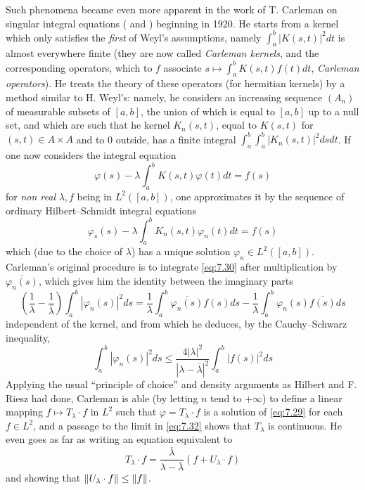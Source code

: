 \documentclass[12pt,a4paper,leqno,twoside]{extbook}
\DeclarePairedDelimiter{\norm}{\lVert}{\rVert}
\begin{document}
Such phenomena became even more apparent in the work of T. Carleman on singular integral equations (\cite{037} and \cite[p.~313--342]{038}) beginning in 1920. He starts from a kernel which only satisfies the \emph{first} of Weyl's assumptions, namely \(\int_a^b |K(s,t)|^2dt\) is almost everywhere finite (they are now called \emph{Carleman kernels}, and the corresponding operators, which to \(f\) associate \(s \mapsto \int_a^b K(s,t)f(t)dt\), \emph{Carleman operators}). He treats the theory of these operators (for hermitian kernels) by a method similar to H. Weyl's: namely, he considers an increasing sequence \((A_n)\) of measurable subsets of \([a,b]\), the union of which is equal to \([a,b]\) up to a null set, and which are such that he kernel \(K_n(s,t)\), equal to \(K(s,t)\) for \((s,t) \in A \times A\) and to 0 outside, has a finite integral \(\int_a^b \int_a^b |K_n(s,t)|^2 dsdt\). If one now considers the integral equation
\begin{equation}
    \label{eq:7.29}
    \varphi(s) - \lambda \int_a^b K(s,t)\varphi(t)dt = f(s)
\end{equation}
for \emph{non real} \(\lambda, f\) being in \(L^2([a,b])\), one approximates it by the sequence of ordinary Hilbert--Schmidt integral equations
\begin{equation}
    \label{eq:7.30}
    \varphi_s(s) - \lambda \int_a^b K_n(s,t)\varphi_n(t)dt = f(s)
\end{equation}
which (due to the choice of \(\lambda\)) has a unique solution \(\varphi_n \in L^2([a,b])\). Carleman's original procedure is to integrate \eqref{eq:7.30} after multiplication by \(\overline{\varphi_n(s)}\), which gives him the identity between the imaginary parts
\begin{equation}
    \label{eq:7.31}
    \left(\frac{1}{\lambda} - \frac{1}{\overline\lambda}\right) \int_a^b |\varphi_n(s)|^2 ds = \frac{1}{\lambda} \int_a^b \overline{\varphi_n(s)}f(s)ds - \frac{1}{\lambda} \int_a^b \varphi_n(s) \overline{f(s)}ds
\end{equation}
independent of the kernel, and from which he deduces, by the Cauchy--Schwarz inequality,
\begin{equation}
    \label{eq:7.32}
    \int_a^b |\varphi_n(s)|^2 ds \leq \frac{4|\lambda|^2}{|\lambda - \overline\lambda|^2} \int_a^b |f(s)|^2 ds
\end{equation}
Applying the usual ``principle of choice'' and density arguments as Hilbert and F. Riesz had done, Carleman is able (by letting \(n\) tend to \(+\infty\)) to define a linear mapping \(f \mapsto T_\lambda \cdot f\) in \(L^2\) such that \(\varphi = T_\lambda \cdot f\) is a solution of \eqref{eq:7.29} for each \(f \in L^2\), and a passage to the limit in \eqref{eq:7.32} shows that \(T_\lambda\) is continuous. He even goes as far as writing an equation equivalent to
\begin{equation}
    \label{eq:7.33}
    T_\lambda \cdot f = \frac{\overline\lambda}{\lambda - \overline\lambda} (f + U_\lambda \cdot f)
\end{equation}
and showing that \(\norm{U_\lambda \cdot f} \leq \norm{f}\).
\end{document}
